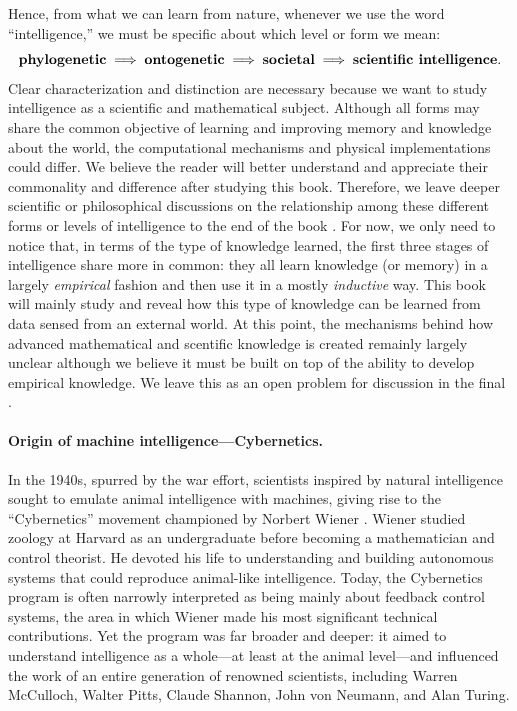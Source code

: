 \documentclass[../../book-main.tex]{subfiles}
\begin{document}
Hence, from what we can learn from nature, whenever we use the word
``intelligence,'' we must be specific about which level or form we mean:
\begin{equation}
    \text{\textbf{phylogenetic}} \;
    \Longrightarrow \; \text{\textbf{ontogenetic}} \; \Longrightarrow \;
    \text{\textbf{societal}}
    \; \Longrightarrow \;
    \text{\textbf{scientific intelligence}}.
\end{equation}
Clear characterization and distinction are necessary because we want
to study intelligence as a scientific and mathematical subject.
Although all forms may share the common objective of learning and
improving memory and knowledge about the world, the computational
mechanisms and physical implementations could differ. We believe the reader will
better understand and appreciate their commonality and difference
after studying this book. Therefore, we leave deeper scientific or
philosophical discussions on the relationship among these different
forms or levels of intelligence  to the end of the book .
For now, we only need to notice that, in terms of the type of knowledge learned, 
the first three stages of intelligence share more in common: they all
learn knowledge (or memory) in a largely {\em empirical} fashion and then use it 
in a mostly {\em inductive} way. This book will mainly study and reveal how this type 
of knowledge can be learned from data sensed from an external world. At this
point, the mechanisms behind how advanced mathematical and scentific knowledge
is created remainly largely unclear although we believe it must be built on top
of the ability to develop empirical knowledge. We leave this as an open problem
for discussion in the final . 

\paragraph{Origin of machine intelligence---Cybernetics.}
In the 1940s, spurred by the war effort, scientists inspired by
natural intelligence sought to emulate animal intelligence with
machines, giving rise to the ``Cybernetics'' movement championed by
Norbert Wiener \cite{Kline-2011}. Wiener studied zoology at Harvard
as an undergraduate before becoming a mathematician and control
theorist. He devoted his life to understanding and building
autonomous systems that could reproduce animal-like intelligence.
Today, the Cybernetics program is often narrowly interpreted as being
mainly about feedback control systems, the area in which Wiener made
his most significant technical contributions. Yet the program was far
broader and deeper: it aimed to understand intelligence as a
whole---at least at the animal level---and influenced the work of an
entire generation of renowned scientists, including Warren McCulloch,
Walter Pitts, Claude Shannon, John von Neumann, and Alan Turing.
\end{document}
